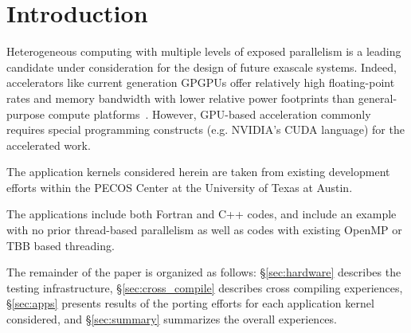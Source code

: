 \section{Introduction}
\label{sec:intro}

Heterogeneous computing with multiple levels of exposed parallelism is
a leading candidate under consideration for the design of
future exascale systems.
Indeed, accelerators like
current generation GPGPUs offer relatively high floating-point rates
and memory bandwidth with lower relative power footprints than
general-purpose compute platforms~\cite{gpu_hpc:2009}. However,
GPU-based acceleration commonly requires special
programming constructs (e.g. NVIDIA's CUDA language) for the
accelerated work.

The application kernels considered herein are taken from existing
development efforts within the PECOS Center at the University of
Texas at Austin.

The applications include
both Fortran and C++ codes, and include an example with no prior
thread-based parallelism as well as codes with existing OpenMP or TBB
based threading.

The remainder of the paper is organized as follows:
\S\ref{sec:hardware} describes the testing infrastructure,
\S\ref{sec:cross_compile} describes
cross compiling experiences, \S\ref{sec:apps} presents
results of the porting efforts for each application kernel
considered, and \S\ref{sec:summary} summarizes the overall experiences.

